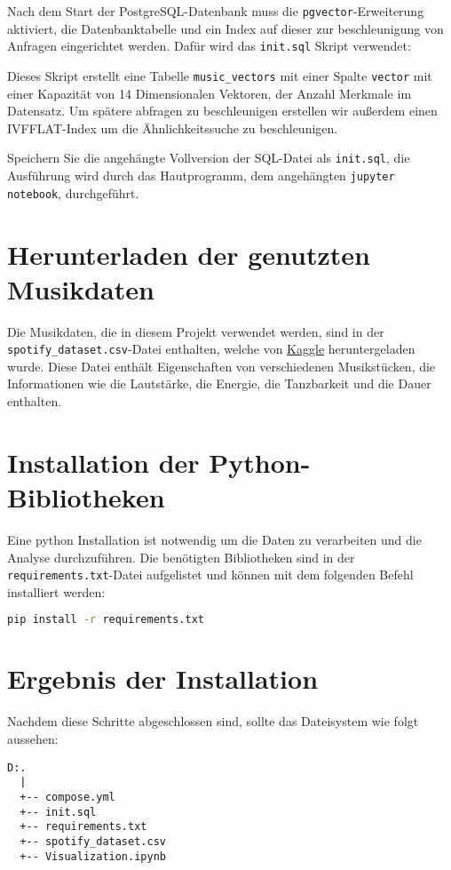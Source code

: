 Nach dem Start der PostgreSQL-Datenbank muss die \texttt{pgvector}-Erweiterung\cite{pgvector} aktiviert, die Datenbanktabelle und ein Index auf dieser zur beschleunigung von Anfragen eingerichtet werden. Dafür wird das \texttt{init.sql} Skript verwendet:



Dieses Skript erstellt eine Tabelle \texttt{music\_vectors} mit einer Spalte \texttt{vector} mit einer Kapazität von 14 Dimensionalen Vektoren, der Anzahl Merkmale im Datensatz. Um spätere abfragen zu beschleunigen erstellen wir außerdem einen IVFFLAT-Index um die Ähnlichkeitssuche zu beschleunigen.

Speichern Sie die angehängte Vollversion der SQL-Datei als \texttt{init.sql}, die Ausführung wird durch das Hautprogramm, dem angehängten \texttt{jupyter notebook}, durchgeführt.

\section{Herunterladen der genutzten Musikdaten}

Die Musikdaten, die in diesem Projekt verwendet werden, sind in der \texttt{spotify\_dataset.csv}-Datei enthalten, welche von \href{https://www.kaggle.com/datasets/bricevergnou/spotify-recommendation}{Kaggle} heruntergeladen wurde. Diese Datei enthält Eigenschaften von verschiedenen Musikstücken, die Informationen wie die Lautstärke, die Energie, die Tanzbarkeit und die Dauer enthalten.

\section{Installation der Python-Bibliotheken}

Eine python Installation ist notwendig um die Daten zu verarbeiten und die Analyse durchzuführen. Die benötigten Bibliotheken sind in der \texttt{requirements.txt}-Datei aufgelistet und können mit dem folgenden Befehl installiert werden:

\begin{lstlisting}[language=bash]
pip install -r requirements.txt
\end{lstlisting}

\section{Ergebnis der Installation}
Nachdem diese Schritte abgeschlossen sind, sollte das Dateisystem wie folgt aussehen:

\begin{lstlisting}[caption={Dateisystem nach Installation}]
D:.
  |
  +-- compose.yml
  +-- init.sql
  +-- requirements.txt
  +-- spotify_dataset.csv
  +-- Visualization.ipynb
\end{lstlisting}